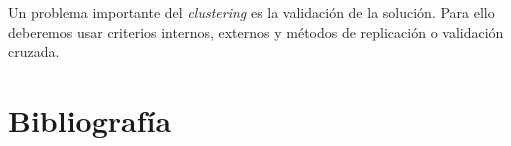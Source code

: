 \documentclass[a4paper, 20pt]{article}
\begin{document}
Un problema importante del \textit{clustering} es la validación de la solución. Para ello deberemos usar criterios internos, externos y métodos de replicación o validación cruzada.

\clearpage
\section{Bibliografía}
\nocite{*}


\end{document}
